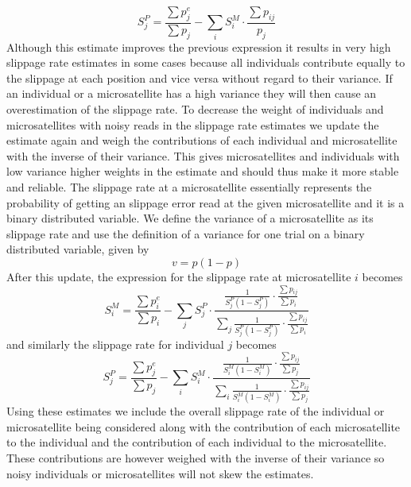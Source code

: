 \documentclass{bioinfo}
\begin{document}
\begin{methods}
\begin{equation}
S^{P}_j = \frac{\sum p^e_j}{\sum p_j} - 
\sum_i S^{M}_i \cdot \frac{\sum p_{ij}}{p_j}
\label{eq:sPjEq}
\end{equation}
Although this estimate improves the previous expression it results in very high slippage rate estimates in some cases because all individuals contribute equally to the slippage at each position and vice versa without regard to their variance. If an individual or a microsatellite has a high variance they will then cause an overestimation of the slippage rate.
To decrease the weight of individuals and microsatellites with noisy reads in the slippage rate estimates we update the estimate again and weigh the contributions of each individual and microsatellite with the inverse of their variance. This gives microsatellites and individuals with low variance higher weights in the estimate and should thus make it more stable and reliable. 
The slippage rate at a microsatellite essentially represents the probability of getting an slippage error read at the given microsatellite and it is a binary distributed variable. We define the variance of a microsatellite as its slippage rate and use the definition of a variance for one trial on a binary distributed variable, given by
\begin{equation}
v = p(1-p)
\end{equation}
After this update, the expression for the slippage rate at microsatellite $i$ becomes 
\begin{equation}
S^{M}_i = \frac{\sum p^e_i}{\sum p_i} - 
\sum_j S^{P}_j \cdot 
\frac{ \frac{1}{S^{P}_j(1-S^{P}_j)} \cdot \frac{\sum p_{ij}}{\sum p_i}}{\sum_j \frac{1}{S^{P}_j(1-S^{P}_j)} \cdot \frac{\sum p_{ij}}{\sum p_i}}
\label{eq:sMiEq2}
\end{equation}
and similarly the slippage rate for individual $j$ becomes 
\begin{equation}
S^{P}_j = \frac{\sum p^e_j}{\sum p_j} - 
\sum_i S^{M}_i \cdot
\frac{ \frac{1}{S^{M}_i(1-S^{M}_i)} \cdot \frac{\sum p_{ij}}{\sum p_j}}
{\sum_i \frac{1}{S^{M}_i(1-S^{M}_i)} \cdot \frac{\sum p_{ij}}{\sum p_j}}
\label{eq:sPjEq2}
\end{equation}
Using these estimates we include the overall slippage rate of the individual or microsatellite being considered along with the contribution of each microsatellite to the individual and the contribution of each individual to the microsatellite. These contributions are however weighed with the inverse of their variance so noisy individuals or microsatellites will not skew the estimates.
\end{methods}
\end{document}
